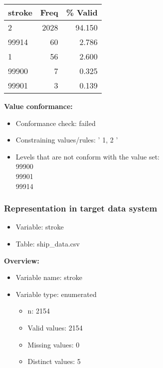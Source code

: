 \documentclass[
]{article}
\providecommand{\tightlist}{%
  \setlength{\itemsep}{0pt}\setlength{\parskip}{0pt}}
\begin{document}
\begin{table}[H]
\centering
\begin{tabular}{l|r|r}
\hline
\textbf{stroke} & \textbf{Freq} & \textbf{\% Valid}\\
\hline
2 & 2028 & 94.150\\
\hline
99914 & 60 & 2.786\\
\hline
1 & 56 & 2.600\\
\hline
99900 & 7 & 0.325\\
\hline
99901 & 3 & 0.139\\
\hline
\end{tabular}
\end{table}

\textbf{Value conformance:}

\begin{itemize}
\tightlist
\item
  Conformance check: failed
\item
  Constraining values/rules: ' 1, 2 '
\item
  Levels that are not conform with the value set:\\
  99900\\
  99901\\
  99914
\end{itemize}

\newpage

\hypertarget{representation-in-target-data-system-26}{%
\subsubsection{\texorpdfstring{Representation in \textbf{target} data
system}{Representation in target data system}}\label{representation-in-target-data-system-26}}

\begin{itemize}
\tightlist
\item
  Variable: stroke
\item
  Table: ship\_data.csv
\end{itemize}

\textbf{Overview:}

\begin{itemize}
\tightlist
\item
  Variable name: stroke
\item
  Variable type: enumerated

  \begin{itemize}
  \tightlist
  \item
    n: 2154
  \item
    Valid values: 2154
  \item
    Missing values: 0
  \item
    Distinct values: 5
  \end{itemize}
\end{itemize}
\end{document}
